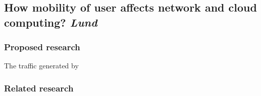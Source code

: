 \subsection{How mobility of user affects network and cloud computing? \emph{Lund}}
\subsubsection{Proposed research}
The traffic generated by 
\subsubsection{Related research}
